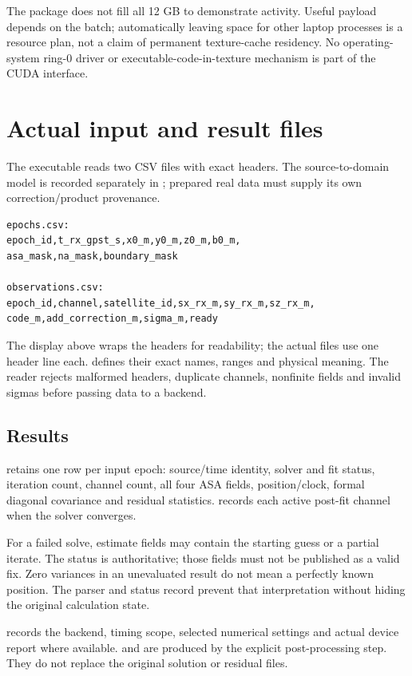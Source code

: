 The package does not fill all 12 GB to demonstrate activity. Useful payload depends
on the batch; automatically leaving space for other laptop processes is a resource
plan, not a claim of permanent texture-cache residency. No operating-system ring-0
driver or executable-code-in-texture mechanism is part of the CUDA interface.
\clearpage

\section{Actual input and result files}
The executable reads two CSV files with exact headers. The source-to-domain model is
recorded separately in ; prepared real data must supply its own
correction/product provenance.

\begin{lstlisting}
epochs.csv:
epoch_id,t_rx_gpst_s,x0_m,y0_m,z0_m,b0_m,
asa_mask,na_mask,boundary_mask

observations.csv:
epoch_id,channel,satellite_id,sx_rx_m,sy_rx_m,sz_rx_m,
code_m,add_correction_m,sigma_m,ready
\end{lstlisting}
The display above wraps the headers for readability; the actual files use one header
line each.  defines their exact names, ranges and physical meaning.
The reader rejects malformed headers, duplicate channels, nonfinite fields and invalid
sigmas before passing data to a backend.

\subsection{Results}
 retains one row per input epoch: source/time identity, solver and
fit status, iteration count, channel count, all four ASA fields, position/clock,
formal diagonal covariance and residual statistics.  records each
active post-fit channel when the solver converges.

For a failed solve, estimate fields may contain the starting guess or a partial
iterate. The status is authoritative; those fields must not be published as a valid
fix. Zero variances in an unevaluated result do not mean a perfectly known position.
The parser and status record prevent that interpretation without hiding the original
calculation state.

 records the backend, timing scope, selected numerical settings and
actual device report where available.  and
 are produced by the explicit post-processing step. They do
not replace the original solution or residual files.

